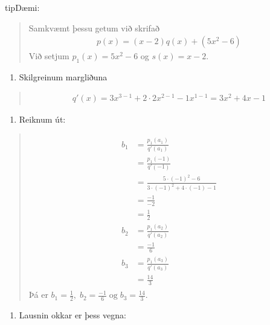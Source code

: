 \documentclass[a4paper,10pt,icelandic]{sphinxmanual}
\begin{document}
\begin{sphinxadmonition}{tip}{Dæmi:}
\begin{quote}
Samkvæmt þessu getum við skrifað
\begin{equation*}
\begin{split}p(x)=(x-2)q(x)+(5x^2-6)\end{split}
\end{equation*}
Við setjum \(p_1(x)=5x^2-6\) og \(s(x)=x-2\).
\end{quote}
\begin{enumerate}
%
\setcounter{enumi}{2}
\item {} 
Skilgreinum margliðuna

\end{enumerate}
\begin{quote}
\begin{equation*}
\begin{split}q'(x)=3x^{3-1}+2\cdot 2x^{2-1} - 1x^{1-1}=3x^2+4x-1\end{split}
\end{equation*}\end{quote}
\begin{enumerate}
%
\setcounter{enumi}{3}
\item {} 
Reiknum út:

\end{enumerate}
\begin{quote}
\begin{equation*}
\begin{split}\begin{aligned}
b_1&=\frac{p_1(a_1)}{q'(a_1)}\\&=\frac{p_1(-1)}{q'(-1)}\\&=\frac{5\cdot(-1)^2-6}{3\cdot(-1)^2+4\cdot(-1)-1}\\&=\frac{-1}{-2}\\&=\frac{1}{2}\\b_2&=\frac{p_1(a_2)}{q'(a_2)}\\&=\frac{-1}{6}\\b_3&=\frac{p_1(a_3)}{q'(a_3)}\\&=\frac{14}{3}\end{aligned}\end{split}
\end{equation*}
Þá er \(b_1 =\frac{1}{2}, \; b_2 =\frac{-1}{6} \; \text{og} \; b_3=\frac{14}{3}\).
\end{quote}
\begin{enumerate}
%
\setcounter{enumi}{4}
\item {} 
Lausnin okkar er þess vegna:


\end{enumerate}
\end{sphinxadmonition}
\end{document}
